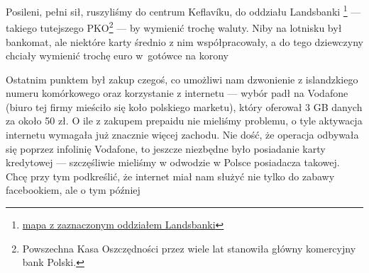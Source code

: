 

Posileni, pełni sił, ruszyliśmy do centrum Keflavíku, do oddziału Landsbanki \footnote{\href{https://www.google.com/url?q=https\%3A\%2F\%2Fmaps.google.com\%2Fmaps\%3Fq\%3D63.995522\%2C-22.548067}{mapa z zaznaczonym oddziałem Landsbanki}} --- takiego tutejszego PKO\footnote{Powszechna Kasa Oszczędności przez wiele lat stanowiła główny komercyjny bank Polski.} --- by wymienić trochę waluty. Niby na lotnisku był bankomat, ale niektóre karty średnio z nim współpracowały, a do tego dziewczyny chciały wymienić trochę euro w~gotówce na korony\textellipsis


Ostatnim punktem był zakup czegoś, co umożliwi nam dzwonienie z islandzkiego numeru komórkowego oraz korzystanie z internetu --- wybór padł na Vodafone (biuro tej firmy mieściło się koło polskiego marketu), który oferował 3 GB danych za około 50 zł. O ile z zakupem prepaidu nie mieliśmy problemu, o tyle aktywacja internetu wymagała już znacznie więcej zachodu. Nie dość, że operacja odbywała się poprzez infolinię Vodafone, to jeszcze niezbędne było posiadanie karty kredytowej --- szczęśliwie mieliśmy w odwodzie w Polsce posiadacza takowej. Chcę przy tym podkreślić, że internet miał nam służyć nie tylko do zabawy facebookiem, ale o tym później\textellipsis

